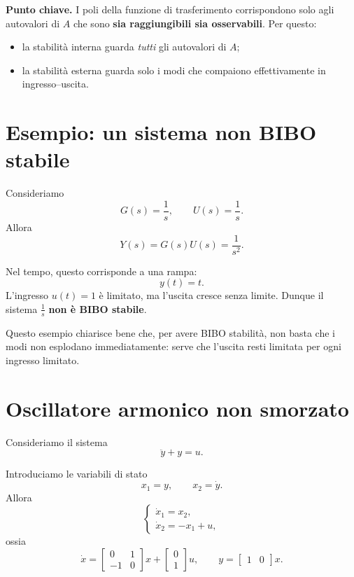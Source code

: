 \medskip

\noindent
\textbf{Punto chiave.}
I poli della funzione di trasferimento corrispondono solo agli autovalori di \(A\) che sono \textbf{sia raggiungibili sia osservabili}. Per questo:
\begin{itemize}
    \item la stabilità interna guarda \emph{tutti} gli autovalori di \(A\);
    \item la stabilità esterna guarda solo i modi che compaiono effettivamente in ingresso--uscita.
\end{itemize}

\bigskip

\section{Esempio: un sistema non BIBO stabile}

Consideriamo
\[
G(s)=\frac{1}{s},
\qquad
U(s)=\frac{1}{s}.
\]
Allora
\[
Y(s)=G(s)U(s)=\frac{1}{s^2}.
\]

Nel tempo, questo corrisponde a una rampa:
\[
y(t)=t.
\]
L'ingresso \(u(t)=1\) è limitato, ma l'uscita cresce senza limite. Dunque il sistema \(\frac{1}{s}\) \textbf{non è BIBO stabile}.

\medskip

Questo esempio chiarisce bene che, per avere BIBO stabilità, non basta che i modi non esplodano immediatamente: serve che l'uscita resti limitata per ogni ingresso limitato.

\bigskip

\section{Oscillatore armonico non smorzato}

Consideriamo il sistema
\[
\ddot y + y = u.
\]

Introduciamo le variabili di stato
\[
x_1=y,\qquad x_2=\dot y.
\]
Allora
\[
\begin{cases}
\dot x_1 = x_2,\\
\dot x_2 = -x_1 + u,
\end{cases}
\]
ossia
\[
\dot x =
\begin{bmatrix}
0 & 1\\
-1 & 0
\end{bmatrix}x+
\begin{bmatrix}
0\\
1
\end{bmatrix}u,
\qquad
y=
\begin{bmatrix}
1 & 0
\end{bmatrix}x.
\]

